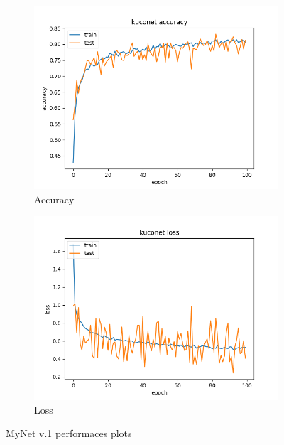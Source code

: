 \documentclass[11pt]{article}
\begin{document}
\begin{figure}[H]
	\centering
	\begin{subfigure}[b]{0.4\linewidth}
		\includegraphics[width=\linewidth]{../images/kuconet_100_epochs_accuracy.png}
		\caption{Accuracy}
	\end{subfigure}
	\begin{subfigure}[b]{0.4\linewidth}
		\includegraphics[width=\linewidth]{../images/kuconet_100_epochs_loss.png}
		\caption{Loss}
	\end{subfigure}
	\caption{MyNet v.1 performaces plots}
	\label{fig:mynet1performances}
\end{figure}
\end{document}
